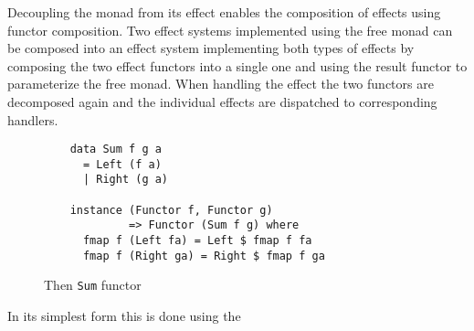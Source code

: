 \label{sec:simple-effect-composition}

Decoupling the monad from its effect enables the composition of
effects using functor composition. Two effect systems implemented
using the free monad can be composed into an effect system
implementing both types of effects by composing the two effect
functors into a single one and using the result functor to
parameterize the free monad. When handling the effect the two functors
are decomposed again and the individual effects are dispatched to
corresponding handlers.

\begin{figure}
  \begin{lstlisting}
    data Sum f g a
      = Left (f a)
      | Right (g a)

    instance (Functor f, Functor g)
             => Functor (Sum f g) where
      fmap f (Left fa) = Left $ fmap f fa
      fmap f (Right ga) = Right $ fmap f ga
  \end{lstlisting}
  \caption{Then \texttt{Sum} functor}
  \label{fig:sum-functor}
\end{figure}

In its simplest form this is done using the 

